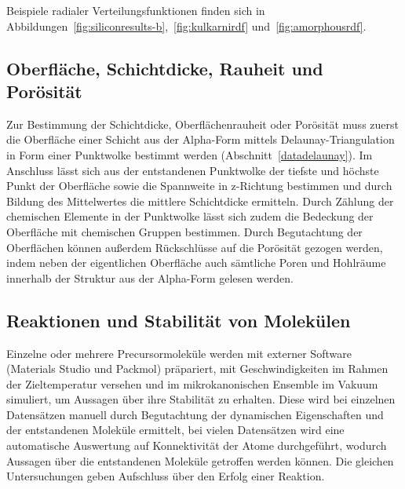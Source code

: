 Beispiele radialer Verteilungsfunktionen finden sich in Abbildungen~\ref{fig:siliconresults-b},~\ref{fig:kulkarnirdf} und~\ref{fig:amorphousrdf}.

\subsection{Oberfläche, Schichtdicke, Rauheit und Porösität}
\label{mdmethods-surface}

Zur Bestimmung der Schichtdicke, Oberflächenrauheit oder Porösität muss zuerst die Oberfläche einer Schicht aus der Alpha-Form mittels Delaunay-Triangulation in Form einer Punktwolke bestimmt werden (Abschnitt~\ref{datadelaunay}).
Im Anschluss lässt sich aus der entstandenen Punktwolke der tiefste und höchste Punkt der Oberfläche sowie die Spannweite in z-Richtung bestimmen und durch Bildung des Mittelwertes die mittlere Schichtdicke ermitteln.
Durch Zählung der chemischen Elemente in der Punktwolke lässt sich zudem die Bedeckung der Oberfläche mit chemischen Gruppen bestimmen.
Durch Begutachtung der Oberflächen können außerdem Rückschlüsse auf die Porösität gezogen werden, indem neben der eigentlichen Oberfläche auch sämtliche Poren und Hohlräume innerhalb der Struktur aus der Alpha-Form gelesen werden.

\subsection{Reaktionen und Stabilität von Molekülen}

Einzelne oder mehrere Precursormoleküle werden mit externer Software (Materials Studio\cite{biovia_materials_2014} und Packmol\cite{martinez_packmol_2009}) präpariert, mit Geschwindigkeiten im Rahmen der Zieltemperatur versehen und im mikrokanonischen Ensemble im Vakuum simuliert, um Aussagen über ihre Stabilität zu erhalten.
Diese wird bei einzelnen Datensätzen manuell durch Begutachtung der dynamischen Eigenschaften und der entstandenen Moleküle ermittelt, bei vielen Datensätzen wird eine automatische Auswertung auf Konnektivität der Atome durchgeführt, wodurch Aussagen über die entstandenen Moleküle getroffen werden können.
Die gleichen Untersuchungen geben Aufschluss über den Erfolg einer Reaktion.
